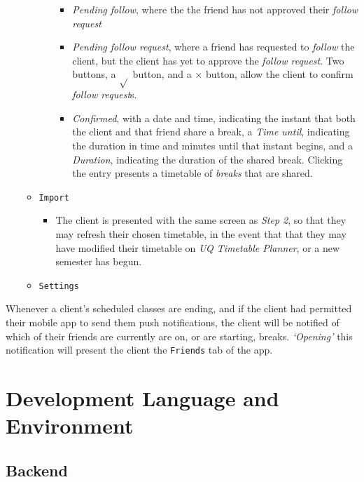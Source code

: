 \documentclass[11pt,a4paper]{report}
\begin{document}
\begin{itemize}
\begin{itemize}
\begin{itemize}
\begin{itemize}
                            \item \textit{Pending follow}, where the the friend has not approved their \textit{follow request}
                            \item \textit{Pending follow request}, where a friend has requested to \textit{follow} the client, but the client has yet to approve the \textit{follow request}. Two buttons, a $\sqrt{}$ button, and a $\times$ button, allow the client to confirm \textit{follow request}s.
                            \item \textit{Confirmed}, with a date and time, indicating the instant that both the client and that friend share a break, a \textit{Time until}, indicating the duration in time and minutes until that instant begins, and a \textit{Duration}, indicating the duration of the shared break. Clicking the entry presents a timetable of \textit{breaks} that are shared.
                        \end{itemize}
                \end{itemize}
            \item \texttt{Import}
                \begin{itemize}
                    \item The client is presented with the same screen as \textit{Step 2}, so that they may refresh their chosen timetable, in the event that that they may have modified their timetable on \textit{UQ Timetable Planner}, or a new semester has begun.
                \end{itemize}
            \item \texttt{Settings}
        \end{itemize}
\end{itemize}

Whenever a client's scheduled classes are ending, and if the client had permitted their mobile app to send them push notifications, the client will be notified of which of their friends are currently are on, or are starting, breaks. \textit{`Opening'} this notification will present the client the \texttt{Friends} tab of the app.


\section{Development Language and Environment}

\subsection{Backend}
\end{document}
